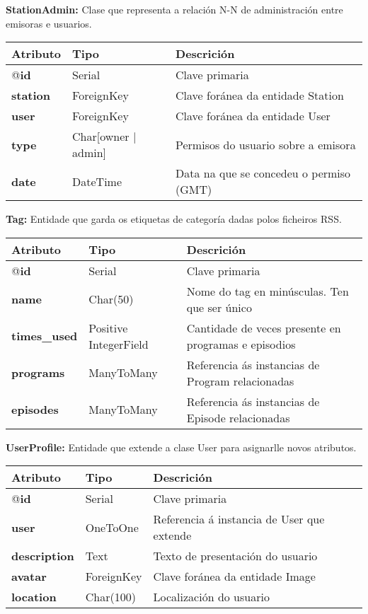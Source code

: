 \textbf{StationAdmin:} Clase que representa a relación N-N de administración entre emisoras e usuarios.

\begin{longtable}{|p{3cm}|p{3cm}|p{8cm}|}
	\hline
	\rowcolor{gray!50}
	Atributo & Tipo & Descrición\\
	\hline
	@\textbf{id} & Serial & Clave primaria\\
	\hline
	\textbf{station} & ForeignKey & Clave foránea da entidade Station\\
	\hline
	\textbf{user} & ForeignKey & Clave foránea da entidade User\\	
	\hline
	\textbf{type} & Char[owner $|$ admin] & Permisos do usuario sobre a emisora\\
	\hline
	\textbf{date} & DateTime & Data na que se concedeu o permiso (GMT)\\
	\hline
\end{longtable}	


\textbf{Tag:}  Entidade que garda os etiquetas de categoría dadas polos ficheiros RSS.

\begin{longtable}{|p{3cm}|p{3cm}|p{8cm}|}
	\hline
	\rowcolor{gray!50}
	Atributo & Tipo & Descrición\\
	\hline
	@\textbf{id} & Serial & Clave primaria\\
	\hline
	\textbf{name} & Char(50) & Nome do tag en minúsculas. Ten que ser único\\
	\hline
	\textbf{times\_used} & Positive IntegerField & Cantidade de veces presente en programas e episodios\\	
	\hline
	\textbf{programs} & ManyToMany & Referencia ás instancias de Program relacionadas\\
	\hline
	\textbf{episodes} & ManyToMany & Referencia ás instancias de Episode relacionadas\\
	\hline
\end{longtable}

\pagebreak
\textbf{UserProfile:}  Entidade que extende a clase User para asignarlle novos atributos.

\begin{longtable}{|p{3cm}|p{3cm}|p{8cm}|}
	\hline
	\rowcolor{gray!50}
	Atributo & Tipo & Descrición\\
	\hline
	@\textbf{id} & Serial & Clave primaria\\
	\hline
	\textbf{user} & OneToOne & Referencia á instancia de User que extende\\
	\hline
	\textbf{description} & Text & Texto de presentación do usuario\\	
	\hline
	\textbf{avatar} & ForeignKey & Clave foránea da entidade Image\\
	\hline
	\textbf{location} & Char(100) & Localización do usuario\\
	\hline
\end{longtable}


